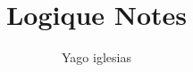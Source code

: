 \documentclass{article}
\begin{document}
\title{Logique Notes}
\author{Yago iglesias}
\maketitle
\tableofcontents
\end{document}
